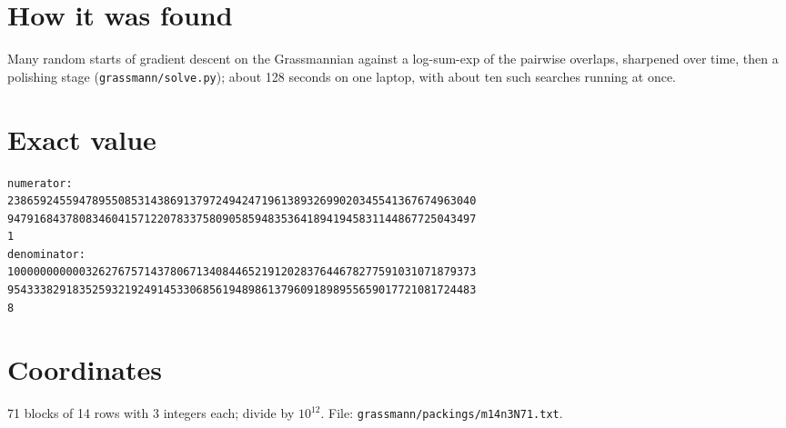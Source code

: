 \documentclass[11pt,a4paper]{article}
\begin{document}
\section{How it was found}
Many random starts of gradient descent on the Grassmannian against a log-sum-exp of the pairwise overlaps, sharpened over time, then a polishing stage (\texttt{grassmann/solve.py}); about 128 seconds on one laptop, with about ten such searches running at once.


\appendix
\section{Exact value}
{\small
\begin{verbatim}
numerator:
238659245594789550853143869137972494247196138932699020345541367674963040
947916843780834604157122078337580905859483536418941945831144867725043497
1
denominator:
100000000000326276757143780671340844652191202837644678277591031071879373
954333829183525932192491453306856194898613796091898955659017721081724483
8
\end{verbatim}}

\section{Coordinates}
71 blocks of 14 rows with 3 integers each; divide by $10^{12}$. File: \texttt{grassmann/packings/m14n3N71.txt}.
{\tiny
\begin{multicols}{3}
\end{multicols}}
\end{document}
